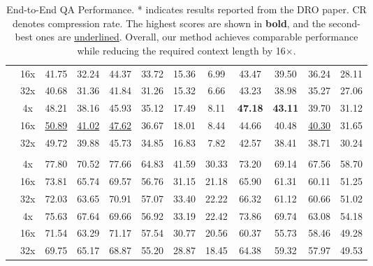 \documentclass{applemlr}
\numberwithin{equation}{section}
\begin{document}
\begin{table}[!h]
\begin{tabular}{c|c|cc|cc|cc|cc|cc}
 & 16x  & 41.75 & 32.24 & 44.37 & 33.72 & 15.36 & 6.99 & 43.47 & 39.50 & 36.24 & 28.11 \\
& 32x   & 40.68 & 31.36 & 41.84 & 31.26 & 15.32 & 6.66 & 43.23 & 38.98 & 35.27 & 27.06 \\
 & 4x &  48.21 & 38.16 & 45.93 & 35.12 & 17.49 &  8.11 & \textbf{47.18} &  \textbf{43.11} & 39.70 & 31.12 \\
& 16x  & \underline{50.89} &  \underline{41.02} & \underline{47.62} & 36.67 & 18.01 & 8.44 & 44.66 &  40.48 & \underline{40.30} & 31.65 \\
 & 32x   & 49.72 &  39.88 & 45.73 & 34.85 & 16.83 &7.82 & 42.57 &  38.41 & 38.71 & 30.24 \\

\hline
{}
 \\

  &  4x & 77.80 & 70.52 & 77.66 & 64.83 & 41.59 & 30.33 & 73.20 & 69.14 & 67.56 & 58.70 \\

 & 16x   & 73.81 & 65.74 & 69.57 & 56.76 & 31.15 & 21.18 & 65.90 & 61.31 & 60.11 & 51.25 \\

 & 32x   & 72.03 & 63.65 & 70.91 & 57.07 & 33.40 & 22.22 & 66.32 & 61.12 & 60.66 & 51.02 \\


     &  4x  & 75.63 &  67.64 & 69.66 &56.92 & 33.19 & 22.42 & 73.86 & 69.74 & 63.08 & 54.18 \\

 & 16x   & 71.54 & 63.29 & 71.17  & 57.54 & 30.77 &  20.56 & 60.37 &  55.73 & 58.46 & 49.28 \\

 & 32x   & 69.75 & 65.17 &  68.87 & 55.20 & 28.87 & 18.45 & 64.38 &  59.32 & 57.97 & 49.53 \\

\toprule
\end{tabular}
\caption{End-to-End QA Performance. * indicates results reported from the DRO paper. CR denotes compression rate. The highest scores are shown in \textbf{bold}, and the second-best ones are \underline{underlined}. Overall, our method achieves comparable performance while reducing the required context length by 16×.}
\label{end-end-qa-mistral}
\end{table}
\end{document}
